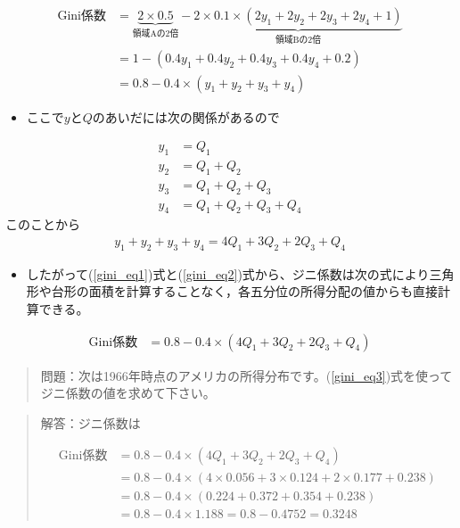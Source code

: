 \documentclass[
]{book}
\providecommand{\tightlist}{%
  \setlength{\itemsep}{0pt}\setlength{\parskip}{0pt}}
\theoremstyle{definition}
\theoremstyle{definition}
\theoremstyle{definition}
\theoremstyle{definition}
\theoremstyle{remark}
\begin{document}
\begin{align}
\text{Gini係数}
&=\underbrace{2 \times 0.5}_{\text{領域Aの2倍}}
-
\underbrace{2 \times 0.1 \times ( 2y_1+2 y_2+2 y_3+2 y_4 +1 )}_{\text{領域Bの2倍}} \nonumber \\
&=1-(0.4y_1+0.4y_2+0.4y_3+0.4y_4+0.2)  \nonumber \\
&=0.8-0.4 \times ( y_1+y_2+y_3+y_4)  \label{gini_eq1}
\end{align}

\begin{itemize}
\tightlist
\item
  ここで\(y\)と\(Q\)のあいだには次の関係があるので
\end{itemize}

\begin{align*}
y_1&=Q_1 \\
y_2&=Q_1+Q_2 \\
y_3&=Q_1+Q_2+Q_3 \\
y_4&=Q_1+Q_2+Q_3+Q_4
\end{align*}
このことから
\begin{align}
y_1+y_2+y_3+y_4=4 Q_1+3 Q_2+2 Q_3+Q_4 \label{gini_eq2}
\end{align}

\begin{itemize}
\tightlist
\item
  したがって(\ref{gini_eq1})式と(\ref{gini_eq2})式から、ジニ係数は次の式により三角形や台形の面積を計算することなく，各五分位の所得分配の値からも直接計算できる。
\end{itemize}

\begin{align}
\text{Gini係数}
&=0.8-0.4 \times ( 4 Q_1+3 Q_2+2 Q_3+Q_4 ) \label{gini_eq3}
\end{align}

\begin{quote}
問題：次は1966年時点のアメリカの所得分布です。(\ref{gini_eq3})式を使ってジニ係数の値を求めて下さい。
\end{quote}

\begin{quote}
解答：ジニ係数は

\begin{align*}
\text{Gini係数}
&=0.8-0.4 \times ( 4 Q_1+3 Q_2+2 Q_3+Q_4 ) \\
&=0.8-0.4 \times ( 4 \times 0.056+3 \times 0.124+2 \times 0.177+0.238 ) \\
&=0.8-0.4 \times ( 0.224+0.372+0.354+0.238 ) \\
&=0.8-0.4 \times 1.188 =0.8-0.4752=0.3248
\end{align*}
\end{quote}
\end{document}

